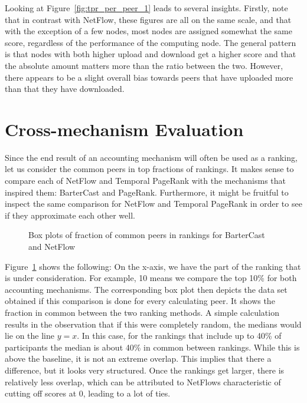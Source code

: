 \documentclass[a4paper,11pt]{book}
\theoremstyle{definition}
\begin{document}
Looking at Figure~\ref{fig:tpr_per_peer_1} leads to several insights. Firstly, note that
in contrast with NetFlow, these figures are all on the same scale, and that with the
exception of a few nodes, most nodes are assigned somewhat the same score, regardless
of the performance of the computing node. The general pattern is that nodes with both
higher upload and download get a higher score and that the absolute amount matters more
than the ratio between the two. However, there appears to be a slight overall bias
towards peers that have uploaded more than that they have downloaded.

\section{Cross-mechanism Evaluation}

Since the end result of an accounting mechanism will often be used as a ranking, let us
consider the common peers in top fractions of rankings. It makes sense to compare each
of NetFlow and Temporal PageRank with the mechanisms that inspired them: BarterCast
and PageRank. Furthermore, it might be fruitful to inspect the same comparison for
NetFlow and Temporal PageRank in order to see if they approximate each other well.

\begin{figure}[ht]
    \centering
    
    \caption{Box plots of fraction of common peers in rankings for BarterCast and NetFlow}
    \label{fig:box_bc_netflow}
\end{figure}

Figure~\ref{fig:box_bc_netflow} shows the following: On the x-axis, we have the part
of the ranking that is under consideration. For example, 10 means we compare the
top 10\% for both accounting mechanisms. The corresponding box plot then depicts
the data set obtained if this comparison is done for every calculating peer. It shows
the fraction in common between the two ranking methods. A simple calculation results
in the observation that if this were completely random, the medians would lie on
the line $y=x$. In this case, for the rankings that include up to 40\% of participants
the median is about 40\% in common between rankings. While this is above the baseline,
it is not an extreme overlap. This implies that there a difference, but it looks very
structured. Once the rankings get larger, there is relatively less overlap, which
can be attributed to NetFlows characteristic of cutting off scores at 0, leading
to a lot of ties.
\end{document}
